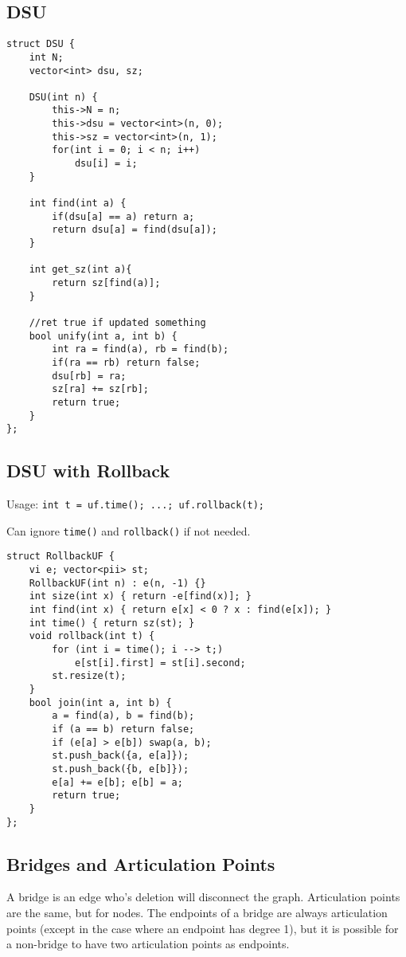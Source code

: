\documentclass[8pt, headheight=10pt, a4paper]{article}
\begin{document}
\begin{multicols*}{3}
\subsection{DSU}
\begin{lstlisting}
struct DSU {
    int N;
    vector<int> dsu, sz;

    DSU(int n) {
        this->N = n;
        this->dsu = vector<int>(n, 0);
        this->sz = vector<int>(n, 1);
        for(int i = 0; i < n; i++)
            dsu[i] = i;
    }

    int find(int a) {
        if(dsu[a] == a) return a;
        return dsu[a] = find(dsu[a]);
    }

    int get_sz(int a){
        return sz[find(a)];
    }

    //ret true if updated something
    bool unify(int a, int b) {
        int ra = find(a), rb = find(b);
        if(ra == rb) return false;
        dsu[rb] = ra;
        sz[ra] += sz[rb];
        return true;
    }
};
\end{lstlisting}

\subsection{DSU with Rollback}
Usage: \lstinline{int t = uf.time(); ...; uf.rollback(t);}

Can ignore \lstinline{time()} and \lstinline{rollback()} if not needed. 
\begin{lstlisting}
struct RollbackUF {
	vi e; vector<pii> st;
	RollbackUF(int n) : e(n, -1) {}
	int size(int x) { return -e[find(x)]; }
	int find(int x) { return e[x] < 0 ? x : find(e[x]); }
	int time() { return sz(st); }
	void rollback(int t) {
		for (int i = time(); i --> t;)
			e[st[i].first] = st[i].second;
		st.resize(t);
	}
	bool join(int a, int b) {
		a = find(a), b = find(b);
		if (a == b) return false;
		if (e[a] > e[b]) swap(a, b);
		st.push_back({a, e[a]});
		st.push_back({b, e[b]});
		e[a] += e[b]; e[b] = a;
		return true;
	}
};
\end{lstlisting}

\subsection{Bridges and Articulation Points}
A bridge is an edge who's deletion will disconnect the graph. Articulation points are the same, but for nodes. The endpoints of a bridge are always articulation points (except in the case where an endpoint has degree 1), but it is possible for a non-bridge to have two articulation points as endpoints. 


\end{multicols*}
\end{document}
